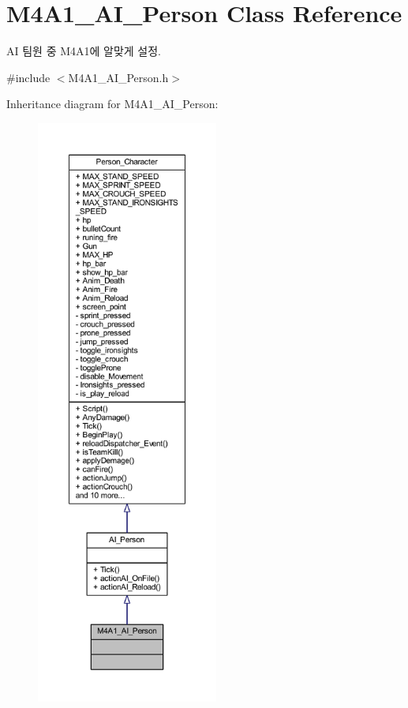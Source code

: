 \hypertarget{class_m4_a1___a_i___person}{}\section{M4\+A1\+\_\+\+A\+I\+\_\+\+Person Class Reference}
\label{class_m4_a1___a_i___person}


AI 팀원 중 M4\+A1에 알맞게 설정.  




{\ttfamily \#include $<$M4\+A1\+\_\+\+A\+I\+\_\+\+Person.\+h$>$}



Inheritance diagram for M4\+A1\+\_\+\+A\+I\+\_\+\+Person\+:
\nopagebreak
\begin{figure}[H]
\begin{center}
\leavevmode
\includegraphics[height=550pt]{class_m4_a1___a_i___person__inherit__graph}
\end{center}
\end{figure}


